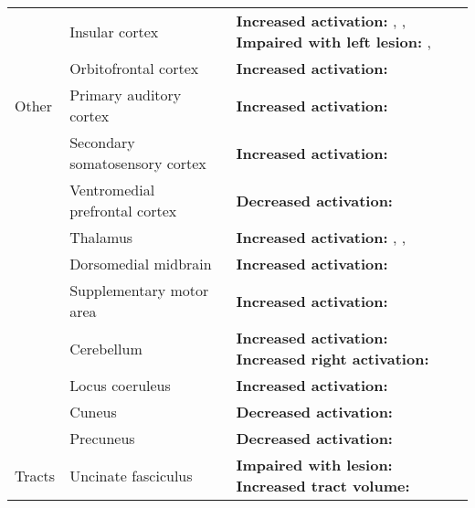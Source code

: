 \begin{table}[t!]
\begin{threeparttable}
\begin{tabular*}{\textwidth}{
    >{\raggedright}p{}
    >{\raggedright}p{}
    >{\raggedright\arraybackslash}p{}}
\cline{2-3}
& Insular cortex & 
    \textbf{Increased activation:} \textcite{blood2001}, \textcite{grunkina2017}, \textcite{klepzig2020} 
    \newline 
    \textbf{Impaired with left lesion:} \textcite{griffiths2004}, \textcite{grunkina2017} \\
    
\cline{2-3}
& Orbitofrontal cortex & 
    \textbf{Increased activation:} \textcite{blood2001} \\
                       
\hline
Other & Primary auditory cortex & 
    \textbf{Increased activation:} \textcite{grunkina2017} \\
    
\cline{2-3}
& Secondary somatosensory cortex & 
    \textbf{Increased activation:} \textcite{grunkina2017} \\
    
\cline{2-3}
& Ventromedial prefrontal cortex & 
    \textbf{Decreased activation:} \textcite{blood2001} \\
    
\cline{2-3}
& Thalamus & 
    \textbf{Increased activation:} \textcite{blood2001}, \textcite{grunkina2017}, \textcite{klepzig2020} \\
    
\cline{2-3}
& Dorsomedial midbrain & 
    \textbf{Increased activation:} \textcite{blood2001} \\
    
\cline{2-3}
& Supplementary motor area & 
    \textbf{Increased activation:} \textcite{blood2001} \\
    
\cline{2-3}
& Cerebellum & 
    \textbf{Increased activation:} \textcite{blood2001} 
    \newline 
    \textbf{Increased right activation:} \textcite{klepzig2020} \\
    
\cline{2-3}
& Locus coeruleus & 
    \textbf{Increased activation:} \textcite{laeng2016} \\
    
\cline{2-3}
& Cuneus & 
    \textbf{Decreased activation:} \textcite{blood2001} \\
    
\cline{2-3}
& Precuneus & 
    \textbf{Decreased activation:} \textcite{blood2001} \\
    
\hline
Tracts & Uncinate fasciculus & 
    \textbf{Impaired with lesion:} \textcite{grunkina2017} 
    \newline 
    \textbf{Increased tract volume:} \textcite{sachs2016} \\
    

\end{tabular*}
\end{threeparttable}
\end{table}
